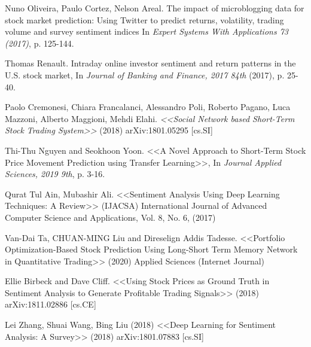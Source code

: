 \documentclass{article}
\begin{document}
\newpage
  


\begin{thebibliography}{1}

Nuno Oliveira, Paulo Cortez, Nelson Areal.
\newblock The impact of microblogging data for stock market prediction: Using
Twitter to predict returns, volatility, trading volume and survey
sentiment indices
\newblock In {\em Expert Systems With Applications 73 (2017)}, p. 125-144.

Thomas Renault.
\newblock Intraday online investor sentiment and return patterns in the U.S.
stock market,
\newblock In {\em Journal of Banking and Finance, 2017 84th} (2017), p. 25-40. 

\newblock Paolo Cremonesi, Chiara Francalanci, Alessandro Poli, Roberto Pagano, Luca Mazzoni, Alberto Maggioni, Mehdi Elahi.
\newblock \emph{<<Social Network based Short-Term Stock Trading System>>} (2018)
\newblock arXiv:1801.05295 [cs.SI]

Thi-Thu Nguyen and Seokhoon Yoon.
\newblock <<A Novel Approach to Short-Term Stock Price
Movement Prediction using Transfer Learning>>,
\newblock In {\em Journal Applied Sciences, 2019 9th}, p. 3-16.

Qurat Tul Ain, Mubashir Ali.
\newblock 	<<Sentiment Analysis Using Deep Learning Techniques: A Review>>
\newblock (IJACSA) International Journal of Advanced Computer Science and Applications, Vol. 8, No. 6, (2017)


\newblock Van-Dai Ta, CHUAN-MING Liu and Direselign Addis Tadesse. 
\newblock <<Portfolio Optimization-Based Stock Prediction Using Long-Short Term Memory Network in Quantitative Trading>> (2020)
\newblock Applied Sciences (Internet Journal)



\newblock Ellie Birbeck and Dave Cliff.
\newblock <<Using Stock Prices as Ground Truth in Sentiment Analysis to Generate Profitable Trading Signals>> (2018)
\newblock arXiv:1811.02886 [cs.CE]

\newblock Lei Zhang, Shuai Wang, Bing Liu (2018)
\newblock <<Deep Learning for Sentiment Analysis: A Survey>> (2018)
\newblock arXiv:1801.07883 [cs.SI]


\end{thebibliography}
\end{document}
